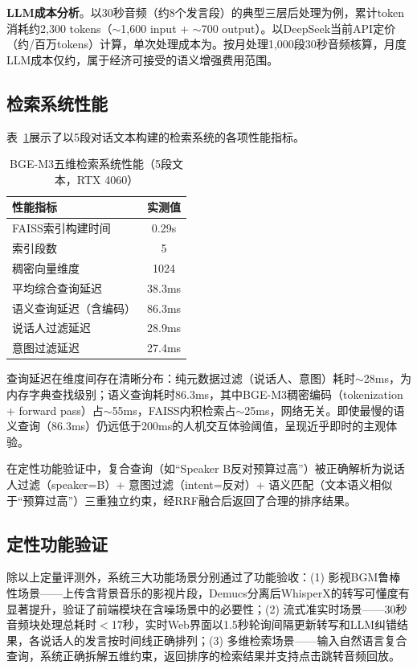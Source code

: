 \documentclass[12pt, a4paper]{article}
\begin{document}
\textbf{LLM成本分析}。以30秒音频（约8个发言段）的典型三层后处理为例，累计token消耗约2,300 tokens（$\sim$1,600 input + $\sim$700 output）。以DeepSeek当前API定价（约/百万tokens）计算，单次处理成本为。按月处理1,000段30秒音频核算，月度LLM成本仅约，属于经济可接受的语义增强费用范围。

\subsection{检索系统性能}

表~\ref{tab:retrieval}展示了以5段对话文本构建的检索系统的各项性能指标。

\begin{table}[H]
\centering
\caption{BGE-M3五维检索系统性能（5段文本，RTX 4060）}
\label{tab:retrieval}
\begin{tabular}{lc}
\toprule
\textbf{性能指标} & \textbf{实测值} \\
\midrule
FAISS索引构建时间 & 0.29s \\
索引段数 & 5 \\
稠密向量维度 & 1024 \\
平均综合查询延迟 & 38.3ms \\
语义查询延迟（含编码） & 86.3ms \\
说话人过滤延迟 & 28.9ms \\
意图过滤延迟 & 27.4ms \\
\bottomrule
\end{tabular}
\end{table}

查询延迟在维度间存在清晰分布：纯元数据过滤（说话人、意图）耗时$\sim$28ms，为内存字典查找级别；语义查询耗时86.3ms，其中BGE-M3稠密编码（tokenization + forward pass）占$\sim$55ms，FAISS内积检索占$\sim$25ms，网络无关。即使最慢的语义查询（86.3ms）仍远低于200ms的人机交互体验阈值，呈现近乎即时的主观体验。

在定性功能验证中，复合查询（如``Speaker B反对预算过高''）被正确解析为说话人过滤（speaker=B）+ 意图过滤（intent=反对）+ 语义匹配（文本语义相似于``预算过高''）三重独立约束，经RRF融合后返回了合理的排序结果。

\subsection{定性功能验证}

除以上定量评测外，系统三大功能场景分别通过了功能验收：(1) 影视BGM鲁棒性场景——上传含背景音乐的影视片段，Demucs分离后WhisperX的转写可懂度有显著提升，验证了前端模块在含噪场景中的必要性；(2) 流式准实时场景——30秒音频块处理总耗时$<$17秒，实时Web界面以1.5秒轮询间隔更新转写和LLM纠错结果，各说话人的发言按时间线正确排列；(3) 多维检索场景——输入自然语言复合查询，系统正确拆解五维约束，返回排序的检索结果并支持点击跳转音频回放。
\end{document}
